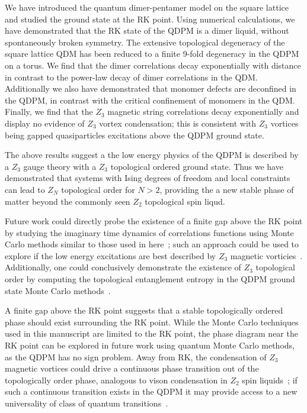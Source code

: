 \documentclass[twocolumn,prb,aps,floatfix,superscriptaddress]{revtex4-1}
\begin{document}
We have introduced the quantum dimer-pentamer model on the square lattice and studied the ground state at the RK point. Using numerical calculations, we have demonstrated that the RK state of the QDPM is a dimer liquid, without spontaneously broken symmetry. The extensive topological degeneracy of the square lattice QDM has been reduced to a finite 9-fold degeneracy in the QDPM on a torus. We find that the dimer correlations decay exponentially with distance in contrast to the power-law decay of dimer correlations in the QDM. Additionally we also have demonstrated that monomer defects are deconfined in the QDPM, in contrast with the critical confinement of monomers in the QDM. Finally, we find that the $Z_3$ magnetic string correlations decay exponentially and display no evidence of $Z_3$ vortex condensation; this is consistent with $Z_3$ vortices being gapped quasiparticles excitations above the QDPM ground state. 

The above results suggest a the low energy physics of the QDPM is described by a $Z_3$ gauge theory with a $Z_3$ topological ordered ground state. Thus we have demonstrated that systems with Ising degrees of freedom and local constraints can lead to $Z_N$ topological order for $N>2$, providing the a new stable phase of matter beyond the commonly seen $Z_2$ topological spin liqud.

Future work could directly probe the existence of a finite gap above the RK point by studying the imaginary time dynamics of correlations functions using Monte Carlo methods similar to those used in here~\cite{Henley1997,Henley2004a}; such an approach could be used to explore if the low energy excitations are best described by $Z_3$ magnetic vorticies~\cite{Ivanov2004,Ralko2007,Misguich2008d}. Additionally, one could conclusively demonstrate the existence of $Z_3$ topological order by computing the topological entanglement entropy in the QDPM ground state Monte Carlo methods~\cite{Levin2005a,Kitaev2006b,Hastings2010}. 

A finite gap above the RK point suggests that a stable topologically ordered phase should exist surrounding the RK point. While the Monte Carlo techniques used in this manuscript are limited to the RK point, the phase diagram near the RK point can be explored in future work using quantum Monte Carlo methods, as the QDPM has no sign problem. Away from RK, the condensation of $Z_3$ magnetic vortices could drive a continuous phase transition out of the topologically order phase, analogous to vison condensation in $Z_2$ spin liquids~\cite{Jalabert1991,Ralko2007,Huh2011,Hao2014,Slagle2014}; if such a continuous transition exists in the QDPM it may provide access to a new universality of class of quantum transitions~\cite{XU2012}.
\end{document}
